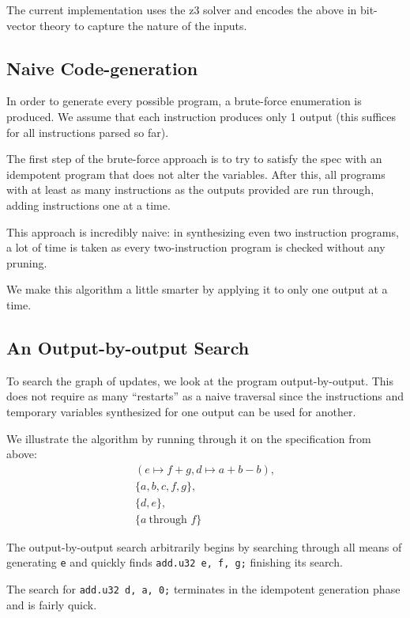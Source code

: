 \documentclass[letterpaper,twocolumn,10pt]{article}
\begin{document}
The current implementation uses the z3 solver and encodes the above in
bit-vector theory to capture the nature of the inputs.

\subsection{Naive Code-generation}

In order to generate every possible program, a brute-force
enumeration is produced. We assume that each instruction
produces only 1 output (this suffices for all instructions
parsed so far).

The first step of the brute-force approach is to try to satisfy the
spec with an idempotent program that does not alter the variables.
After this, all programs with at least as many instructions as the
outputs provided are run through, adding instructions one at a time.

This approach is incredibly naive: in synthesizing even two instruction
programs, a lot of time is taken as every two-instruction program is
checked without any pruning.

We make this algorithm a little smarter by applying it to only one output
at a time.

\subsection{An Output-by-output Search}

To search the graph of updates, we look at the program output-by-output.
This does not require as many ``restarts'' as a naive traversal
since the instructions and temporary variables synthesized for
one output can be used for another.

We illustrate the algorithm by running through it on the specification from above:
\begin{align*}
    (e \mapsto f + g, d \mapsto a + b - b), \\
    \{a, b, c, f, g\}, \\
    \{d, e\}, \\
    \{a\ \text{through } f\}
\end{align*}

The output-by-output search arbitrarily begins by searching through
all means of generating \texttt{e} and quickly finds \texttt{add.u32 e, f, g;}
finishing its search.

The search for \texttt{add.u32 d, a, 0;}
terminates in the idempotent generation phase and is fairly quick.
\end{document}
